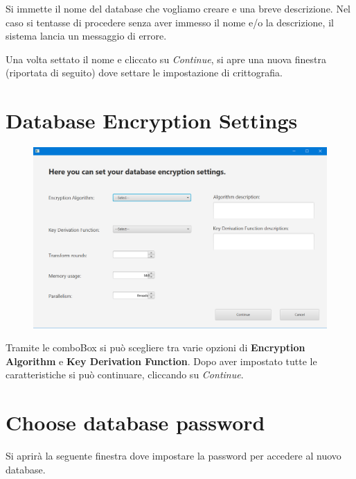 \documentclass[a4paper,12pt]{report}
\begin{document}
Si immette il nome del database che vogliamo creare e una breve descrizione. Nel caso si tentasse di procedere senza aver immesso il nome e/o la descrizione, il sistema lancia un messaggio di errore.

Una volta settato il nome e cliccato su \textit{Continue}, si apre una nuova finestra (riportata di seguito) dove settare le impostazione di crittografia.

\clearpage

\section*{Database Encryption Settings}

\begin{figure}[h]
\centering{}
\includegraphics[width=\textwidth]{user-manual/4}
\end{figure}

Tramite le comboBox si può scegliere tra varie opzioni di \textbf{Encryption Algorithm} e \textbf{Key Derivation Function}. Dopo aver impostato tutte le caratteristiche si può continuare, cliccando su \textit{Continue}.

\clearpage

\section*{Choose database password}
Si aprirà la seguente finestra dove impostare la password per accedere al nuovo database.
\end{document}
